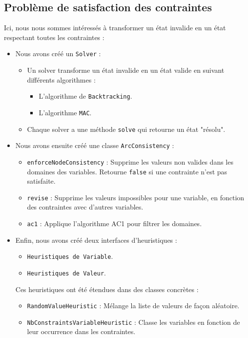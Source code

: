 \documentclass[12pt]{article}
\begin{document}
        \subsection{Problème de satisfaction des contraintes}
            Ici, nous nous sommes intéressés à transformer un état invalide en un état respectant toutes les contraintes :
            \begin{itemize}
                \item Nous avons créé un \texttt{Solver} :
                    \begin{itemize}
                        \item Un solver transforme un état invalide en un état valide en suivant différents algorithmes :
                            \begin{itemize}
                                \item L'algorithme de \texttt{Backtracking}.
                                \item L'algorithme \texttt{MAC}.
                            \end{itemize}
                        \item Chaque solver a une méthode \texttt{solve} qui retourne un état "résolu".
                    \end{itemize}
                \item Nous avons ensuite créé une classe \texttt{ArcConsistency} :
                    \begin{itemize}
                        \item \texttt{enforceNodeConsistency} : Supprime les valeurs non valides dans les domaines des variables. Retourne \texttt{false} si une contrainte n’est pas satisfaite.
                        \item \texttt{revise} : Supprime les valeurs impossibles pour une variable, en fonction des contraintes avec d'autres variables.
                        \item \texttt{ac1} : Applique l'algorithme AC1 pour filtrer les domaines.
                    \end{itemize}
                \item Enfin, nous avons créé deux interfaces d’heuristiques :
                    \begin{itemize}
                        \item \texttt{Heuristiques de Variable}.
                        \item \texttt{Heuristiques de Valeur}.
                    \end{itemize}
                    Ces heuristiques ont été étendues dans des classes concrètes :
                    \begin{itemize}
                        \item \texttt{RandomValueHeuristic} : Mélange la liste de valeurs de façon aléatoire.
                        \item \texttt{NbConstraintsVariableHeuristic} : Classe les variables en fonction de leur occurrence dans les contraintes.
                    \end{itemize}
            \end{itemize}
\end{document}
